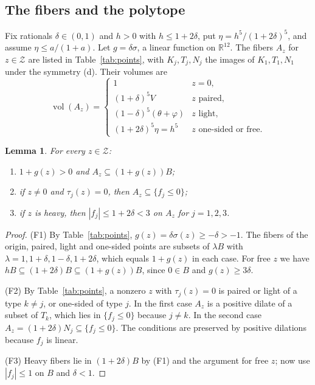 \documentclass[11pt]{article}
\newtheorem{lemma}[theorem]{Lemma}
\newcommand{\R}{\mathbb{R}}
\newcommand{\Zcal}{\mathcal{Z}}
\newcommand{\1}{\mathbf{1}}
\DeclareMathOperator{\vol}{vol}
\begin{document}
\subsection{The fibers and the polytope}\label{sec:polytope}

Fix rationals $\delta\in(0,1)$ and $h>0$ with $h\le1+2\delta$, put $\eta=h^5/(1+2\delta)^5$, and assume
$\eta\le a/(1+a)$. Let $g=\delta\sigma$, a linear function on $\R^{12}$. The fibers $A_z$ for $z\in\Zcal$ are listed in
Table~\ref{tab:points}, with $K_j,T_j,N_j$ the images of $K_1,T_1,N_1$ under the symmetry (d). Their volumes are
\[
\vol(A_z)=\begin{cases}1&z=0,\\(1+\delta)^5V&z\text{ paired},\\(1-\delta)^5(\theta+\varphi)&z\text{ light},\\
(1+2\delta)^5\eta=h^5&z\text{ one-sided or free}.\end{cases}
\]

\begin{lemma}\label{lem:fibers}
For every $z\in\Zcal$:
\begin{enumerate}[label=(F\arabic*)]
\item $1+g(z)>0$ and $A_z\subseteq(1+g(z))B$;
\item if $z\ne0$ and $\tau_j(z)=0$, then $A_z\subseteq\{f_j\le0\}$;
\item if $z$ is heavy, then $|f_j|\le1+2\delta<3$ on $A_z$ for $j=1,2,3$.
\end{enumerate}
\end{lemma}

\begin{proof}
(F1) By Table~\ref{tab:points}, $g(z)=\delta\sigma(z)\ge-\delta>-1$. The fibers of the origin, paired, light and one-sided
points are subsets of $\lambda B$ with $\lambda=1,1+\delta,1-\delta,1+2\delta$, which equals $1+g(z)$ in each case. For free
$z$ we have $hB\subseteq(1+2\delta)B\subseteq(1+g(z))B$, since $0\in B$ and $g(z)\ge3\delta$.

(F2) By Table~\ref{tab:points}, a nonzero $z$ with $\tau_j(z)=0$ is paired or light of a type $k\ne j$, or one-sided of type
$j$. In the first case $A_z$ is a positive dilate of a subset of $T_k$, which lies in $\{f_j\le0\}$ because $j\ne k$. In the
second case $A_z=(1+2\delta)N_j\subseteq\{f_j\le0\}$. The conditions are preserved by positive dilations because $f_j$ is
linear.

(F3) Heavy fibers lie in $(1+2\delta)B$ by (F1) and the argument for free $z$; now use $|f_j|\le1$ on $B$ and $\delta<1$.
\end{proof}
\end{document}
